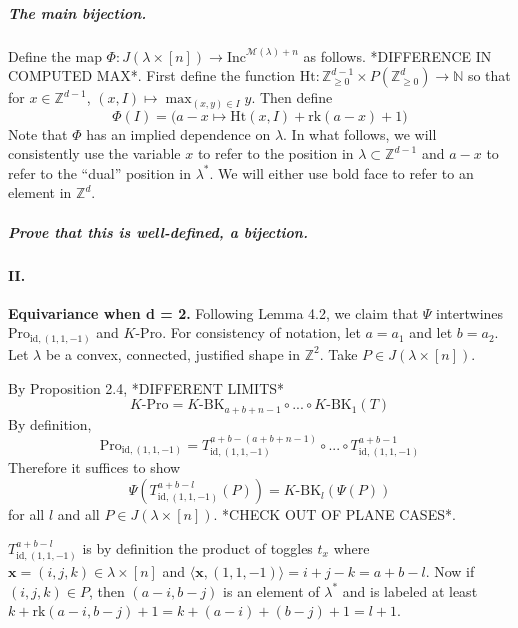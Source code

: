 \documentclass[10pt,letter]{article}
\begin{document}
\subparagraph*{The main bijection.}   Define the map $\Phi: J(\lambda \times [n]) \rightarrow \text{Inc}^{\mathcal{M}(\lambda)+ n}$ as follows. *DIFFERENCE IN COMPUTED MAX*. First define the function $\text{Ht}: \mathbb{Z}_{\geq 0}^{d-1} \times P(\mathbb{Z}_{\geq 0}^d) \rightarrow \mathbb{N}$ so that for $x \in \mathbb{Z}^{d-1}$, $(x,I) \mapsto \max_{(x,y) \in I} y$.  Then define 
\begin{equation*}
\Phi(I) = \bigg( a - x \mapsto \text{Ht}(x,I) + \text{rk}(a-x) + 1 \bigg)
\end{equation*}
Note that $\Phi$ has an implied dependence on $\lambda$. In what follows, we will consistently use the variable $x$ to refer to the position in $\lambda \subset \mathbb{Z}^{d-1}$ and $a-x$ to refer to the ``dual'' position in $\lambda^{\ast}$. We will either use bold face to refer to an element in $\mathbb{Z}^d$.

\subparagraph*{Prove that this is well-defined, a bijection.}

\paragraph*{II.} \textbf{Equivariance when d = 2.} Following Lemma 4.2, we claim that $\Psi$ intertwines $\text{Pro}_{\text{id},(1,1,-1)}$ and $K$-$\text{Pro}$. For consistency of notation, let $a = a_1$ and let $b = a_2$. Let $\lambda$ be a convex, connected, justified shape in $\mathbb{Z}^2$. Take $P \in J(\lambda \times [n])$. 

By Proposition 2.4, *DIFFERENT LIMITS*
\begin{equation*}
K\text{-}\text{Pro} = K\text{-}\text{BK}_{a+b+n-1} \circ  ... \circ K\text{-}\text{BK}_1(T)
\end{equation*}
By definition, 
\begin{equation*}
\text{Pro}_{\text{id},(1,1,-1)} = T^{a+b-(a+b+n-1)}_{\text{id},(1,1,-1)} \circ ... \circ T^{a+b-1}_{\text{id},(1,1,-1)}
\end{equation*}
Therefore it suffices to show 
\begin{equation*}
\Psi(T^{a+b-l}_{\text{id},(1,1,-1)}(P)) = K\text{-}\text{BK}_l(\Psi(P))
\end{equation*}
for all $l$ and all $P \in J(\lambda \times [n])$. *CHECK OUT OF PLANE CASES*.

$T^{a+b-l}_{\text{id},(1,1,-1)}$ is by definition the product of toggles $t_x$ where $\textbf{x} = (i,j,k) \in \lambda \times [n]$ and $\langle \textbf{x},(1,1,-1) \rangle = i + j - k = a+b - l$. Now if $(i,j,k) \in P$, then $(a-i,b-j)$ is an element of $\lambda^{\ast}$ and is labeled at least $k + \text{rk}(a-i,b-j) + 1= k + (a-i) + (b-j) + 1 = l + 1$. 
\end{document}

